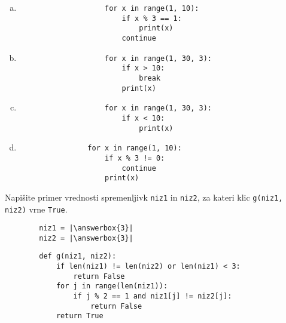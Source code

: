 \documentclass[arhiv, 10pt]{../izpit}
\newcommand{\inlinepy}[1]{\texttt{#1}}
\newcommand{\answerbox}[1]{\framebox{\vphantom{\large M}\hspace{#1cm}}}
\begin{document}
        \begin{multicols}{2}
        \begin{enumerate}[(a)]
\item 
                \begin{verbatim}
                    for x in range(1, 10):
                        if x % 3 == 1:
                            print(x)
                        continue
                \end{verbatim}
            
\item 
                \begin{verbatim}
                    for x in range(1, 30, 3):
                        if x > 10:
                            break
                        print(x)
                \end{verbatim}
            
\item 
                \begin{verbatim}
                    for x in range(1, 30, 3):
                        if x < 10:
                            print(x)
                \end{verbatim}
            
\item 
            \begin{verbatim}
                for x in range(1, 10):
                    if x % 3 != 0:
                        continue
                    print(x)
            \end{verbatim}
        
\end{enumerate}

        \end{multicols}
    
        \naloga*
        \begin{multicols}{2}
        \noindent
        Napišite primer vrednosti spremenljivk \inlinepy{niz1} in \inlinepy{niz2}, za kateri klic \inlinepy{g(niz1, niz2)} vrne \inlinepy{True}.
        \begin{verbatim}
        niz1 = |\answerbox{3}|
        niz2 = |\answerbox{3}|
        \end{verbatim}
        \vfil
        \columnbreak
        \begin{verbatim}
        def g(niz1, niz2):
            if len(niz1) != len(niz2) or len(niz1) < 3:
                return False
            for j in range(len(niz1)):
                if j % 2 == 1 and niz1[j] != niz2[j]:
                    return False
            return True
        \end{verbatim}
        \end{multicols}
    
\end{document}
